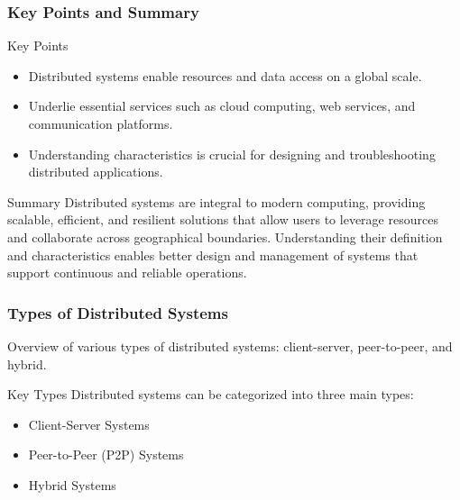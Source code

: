 \documentclass[aspectratio=169]{beamer}
\begin{document}
\begin{frame}[fragile]
    \frametitle{Key Points and Summary}
    \begin{block}{Key Points}
        \begin{itemize}
            \item Distributed systems enable resources and data access on a global scale.
            \item Underlie essential services such as cloud computing, web services, and communication platforms.
            \item Understanding characteristics is crucial for designing and troubleshooting distributed applications.
        \end{itemize}
    \end{block}

    \begin{block}{Summary}
        Distributed systems are integral to modern computing, providing scalable, efficient, and resilient solutions that allow users to leverage resources and collaborate across geographical boundaries.
        Understanding their definition and characteristics enables better design and management of systems that support continuous and reliable operations.
    \end{block}
\end{frame}

\begin{frame}[fragile]
    \frametitle{Types of Distributed Systems}
    Overview of various types of distributed systems: client-server, peer-to-peer, and hybrid.

    \begin{block}{Key Types}
        Distributed systems can be categorized into three main types:
        \begin{itemize}
            \item Client-Server Systems
            \item Peer-to-Peer (P2P) Systems
            \item Hybrid Systems
        \end{itemize}
    \end{block}
\end{frame}
\end{document}
